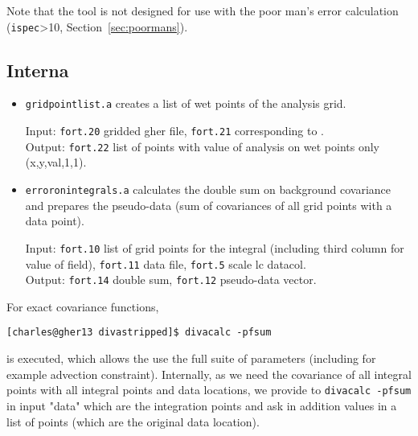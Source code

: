 Note that the tool is not designed for use with the poor man's error calculation (\texttt{ispec}>10, Section~\ref{sec:poormans}).

\subsection{Interna}

\begin{itemize}

\item \texttt{gridpointlist.a} creates a list of wet points of the analysis grid. 

Input: \texttt{fort.20} gridded gher file, \texttt{fort.21} corresponding to .\\ 
Output: \texttt{fort.22} list of points with value of analysis on wet points only (x,y,val,1,1).

\item \texttt{erroronintegrals.a} calculates the double sum on background covariance and prepares the pseudo-data (sum of covariances of all grid points with a  data point).

Input: \texttt{fort.10} list of grid points for the integral (including third column for value of field), \texttt{fort.11} data file, \texttt{fort.5} scale lc datacol.\\
Output: \texttt{fort.14} double sum, \texttt{fort.12} pseudo-data vector.
\end{itemize}

For exact covariance functions, 

\begin{lstlisting}[style=Bash]
[charles@gher13 divastripped]$ divacalc -pfsum
\end{lstlisting}

is executed, which allows the use the full suite of \diva parameters (including for example advection constraint). Internally, as we need the covariance of all integral points with all integral points and data locations, we provide to {\tt divacalc -pfsum} in input "data" which are the integration points and ask in addition values in a list of points (which are the original data location).

